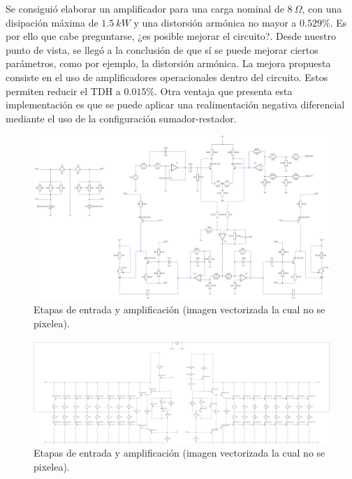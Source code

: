 Se consiguió elaborar un amplificador para una carga nominal de $8 \ \Omega$, con una disipación máxima de $1.5 \ kW$ y una distorsión armónica no mayor a $0.529\%$. Es por ello que cabe preguntarse, ¿es posible mejorar el circuito?. Desde nuestro punto de vista, se llegó a la conclusión de que sí se puede mejorar ciertos parámetros, como por ejemplo, la distorsión armónica. La mejora propuesta consiste en el uso de amplificadores operacionales dentro del circuito. Estos permiten reducir el TDH a $0.015 \%$. Otra ventaja que presenta esta implementación es que se puede aplicar una realimentación negativa diferencial mediante el uso de la configuración sumador-restador.

\begin{figure}[H]
\centering
	\includegraphics[width=\textwidth]{./ImagenesConclusiones/VOPTEX1.pdf}
	\caption{Etapas de entrada y amplificación (imagen vectorizada la cual no se pixelea).}	
\end{figure}
\begin{figure}[H]
\centering
	\includegraphics[width=\textwidth]{./ImagenesConclusiones/VOPTEX2.pdf}
	\caption{Etapas de entrada y amplificación (imagen vectorizada la cual no se pixelea).}
\end{figure}